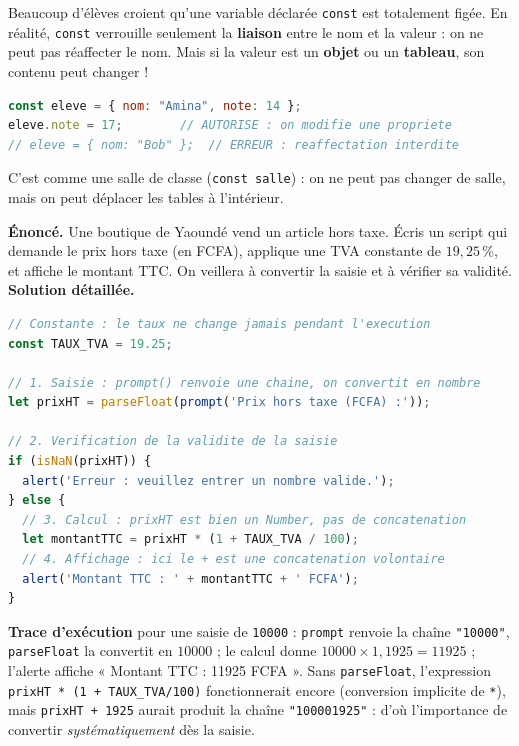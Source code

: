 \documentclass[11pt]{article}
\begin{document}
\begin{savaistu}
Beaucoup d'élèves croient qu'une variable déclarée \texttt{const} est totalement figée. En réalité, \texttt{const} verrouille seulement la \textbf{liaison} entre le nom et la valeur : on ne peut pas réaffecter le nom. Mais si la valeur est un \textbf{objet} ou un \textbf{tableau}, son contenu peut changer !
\begin{lstlisting}[language=JavaScript]
const eleve = { nom: "Amina", note: 14 };
eleve.note = 17;        // AUTORISE : on modifie une propriete
// eleve = { nom: "Bob" };  // ERREUR : reaffectation interdite
\end{lstlisting}
C'est comme une salle de classe (\texttt{const salle}) : on ne peut pas changer de salle, mais on peut déplacer les tables à l'intérieur.
\end{savaistu}

\begin{exoresolu}
\textbf{Énoncé.} Une boutique de Yaoundé vend un article hors taxe. Écris un script qui demande le prix hors taxe (en FCFA), applique une TVA constante de $19,25\,\%$, et affiche le montant TTC. On veillera à convertir la saisie et à vérifier sa validité.
\tcblower
\textbf{Solution détaillée.}
\begin{lstlisting}[language=JavaScript]
// Constante : le taux ne change jamais pendant l'execution
const TAUX_TVA = 19.25;

// 1. Saisie : prompt() renvoie une chaine, on convertit en nombre
let prixHT = parseFloat(prompt('Prix hors taxe (FCFA) :'));

// 2. Verification de la validite de la saisie
if (isNaN(prixHT)) {
  alert('Erreur : veuillez entrer un nombre valide.');
} else {
  // 3. Calcul : prixHT est bien un Number, pas de concatenation
  let montantTTC = prixHT * (1 + TAUX_TVA / 100);
  // 4. Affichage : ici le + est une concatenation volontaire
  alert('Montant TTC : ' + montantTTC + ' FCFA');
}
\end{lstlisting}
\textbf{Trace d'exécution} pour une saisie de \texttt{10000} : \texttt{prompt} renvoie la chaîne \texttt{"10000"}, \texttt{parseFloat} la convertit en $10000$ ; le calcul donne $10000 \times 1{,}1925 = 11925$ ; l'alerte affiche « Montant TTC : 11925 FCFA ». Sans \texttt{parseFloat}, l'expression \texttt{prixHT * (1 + TAUX\_TVA/100)} fonctionnerait encore (conversion implicite de \texttt{*}), mais \texttt{prixHT + 1925} aurait produit la chaîne \texttt{"100001925"} : d'où l'importance de convertir \emph{systématiquement} dès la saisie.
\end{exoresolu}
\end{document}
